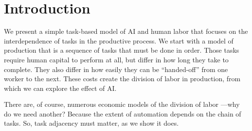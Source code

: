 \documentclass{article}
\theoremstyle{plain}
\theoremstyle{plain}
\begin{document}
\onehalfspacing

\section{Introduction}
We present a simple task-based model of AI and human labor that focuses on the interdependence of tasks in the productive process.
We start with a model of production that is a sequence of tasks that must be done in order.
Those tasks require human capital to perform at all, but differ in how long they take to complete.
They also differ in how easily they can be ``handed-off'' from one worker to the next.
These costs create the division of labor in production, from which we can explore the effect of AI.

There are, of course, numerous economic models of the division of labor \citep{becker1992division, deming2017growing}---why do we need another?
Because the extent of automation depends on the chain of tasks. 
So, task adjacency must matter, as we show it does.


\end{document}

